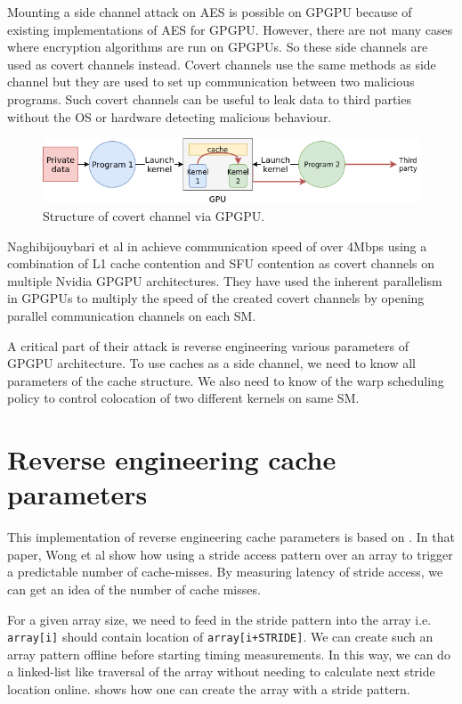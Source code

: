 Mounting a side channel attack on AES is possible on GPGPU because of existing implementations of AES for GPGPU.
However, there are not many cases where encryption algorithms are run on GPGPUs. So these side channels are used
as covert channels instead. Covert channels use the same methods as side channel but they are used to set up
communication between two malicious programs. Such covert channels can be useful to leak data to third parties
without the OS or hardware detecting malicious behaviour.

\begin{figure}[h]
\centering
\includegraphics[width=\textwidth]{covert_channel}
\caption[Covert channel on GPGPU]{Structure of covert channel via GPGPU.}
\label{fig:gpgpu}
\end{figure}

Naghibijouybari et al in  achieve communication speed of over 4Mbps using
a combination of L1 cache contention and SFU contention as covert channels on multiple Nvidia GPGPU
architectures. They have used the inherent parallelism in GPGPUs to multiply the speed of the created
covert channels by opening parallel communication channels on each SM.

A critical part of their attack is reverse engineering various parameters of GPGPU architecture.
To use caches as a side channel, we need to know all parameters of the cache structure. We also need
to know of the warp scheduling policy to control colocation of two different kernels on same SM.

\section{Reverse engineering cache parameters}

This implementation of reverse engineering cache parameters is based on . In that paper, Wong et al
show how using a stride access pattern over an array to trigger a predictable number of cache-misses.
By measuring latency of stride access, we can get an idea of the number of cache misses.

For a given array size, we need to feed in the stride pattern into the array i.e.
\texttt{array[i]} should contain location of \texttt{array[i+STRIDE]}. We can create such an
array pattern offline before starting timing measurements. In this way, we can do a linked-list like
traversal of the array without needing to calculate next stride location online.
 shows how one can create the array with a stride pattern.


